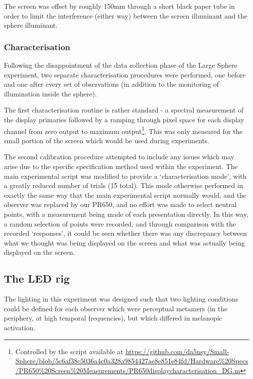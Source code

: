 The screen was offset by roughly 150mm through a short black paper tube in order to limit the interference (either way) between the screen illuminant and the sphere illuminant. 



\subsubsection{Characterisation}

Following the disappointment of the data collection phase of the Large Sphere experiment, two separate characterisation procedures were performed, one before and one after every set of observations (in addition to the monitoring of illumination inside the sphere).

The first characterisation routine is rather standard - a spectral measurement of the display primaries followed by a ramping through pixel space for each display channel from zero output to maximum output\footnote{Controlled by the script available at \url{https://github.com/da5nsy/Small-Sphere/blob/5c6af38c5036a4c0a328a9854427ae8e851e84fd/Hardware\%20Specs/PR650\%20Screen\%20Measurements/PR650displaycharacterisation_DG.m}}. This was only measured for the small portion of the screen which would be used during experiments.

The second calibration procedure attempted to include any issues which may arise due to the specific specification method used within the experiment. The main experimental script was modified to provide a `characterisation mode', with a greatly reduced number of trials (15 total). This mode otherwise performed in exactly the same way that the main experimental script normally would, and the observer was replaced by our \gls{PR650}, and no effort was made to select neutral points, with a measurement being made of each presentation directly. In this way, a random selection of points were recorded, and through comparison with the recorded `responses', it could be seen whether there was any discrepancy between what we thought was being displayed on the screen and what was actually being displayed on the screen.

\subsection{The LED rig}

The lighting in this experiment was designed such that two lighting conditions could be defined for each observer which were perceptual metamers (in the periphery, at high temporal frequencies), but which differed in melanopic activation.

